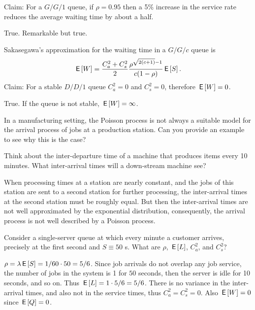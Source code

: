 \documentclass[stochastic-or.tex]{subfiles}
\begin{document}
\begin{truefalse}
Claim: For a $G/G/1$ queue, if $\rho=0.95$ then a 5\% increase in the service rate reduces the average waiting time by about a half.
    \begin{solution}
        True. Remarkable but true.
    \end{solution}
\end{truefalse}

\begin{truefalse}
Sakasegawa's approximation for the waiting time in a $G/G/c$ queue is
\begin{equation*}
 \,\mathsf{E}\left[W\right] = \frac{C_a^2+C_s^2}2 \frac{\rho^{\sqrt{2(c+1)}-1}}{c(1-\rho)} \,\mathsf{E}\left[S\right].
\end{equation*}
Claim: For a stable $D/D/1$ queue $C_a^2=0$ and $C_s^2=0$, therefore $\,\mathsf{E}\left[W\right]=0$.
\begin{solution}
True. If the queue is not stable, $\,\mathsf{E}\left[W\right] = \infty$.
\end{solution}
\end{truefalse}

\begin{exercise}
In a manufacturing setting, the Poisson process is not always a suitable model for the arrival process of jobs at a production station. Can you provide an example to see why this is the case?
\begin{hint}
Think about the inter-departure time of a machine that produces items every 10 minutes. What inter-arrival times will a down-stream machine see?

\end{hint}
\begin{solution}
  When processing times at a station are nearly constant, and the jobs of this station are sent to a second station for further processing, the inter-arrival times at the second station must be roughly equal.
  But then the inter-arrival times are not well approximated by the exponential distribution, consequently, the arrival process is not well described by a Poisson process.
\end{solution}
\end{exercise}


\begin{exercise}\label{ex:77}
 Consider  a single-server queue at which every minute a customer arrives, precisely at the first second and $S\equiv 50$ s.
 What are $\rho$, $\,\mathsf{E}\left[L\right]$, $C_a^2$, and $C_s^2$?
\begin{solution}
 $\rho = \lambda \,\mathsf{E}\left[S\right] = 1/60 \cdot 50 = 5/6$.
 Since job arrivals do not overlap any job service, the number of jobs in the system is 1 for $50$ seconds, then the server is idle for 10 seconds, and so on.
 Thus $\,\mathsf{E}\left[L\right] = 1\cdot5/6 = 5/6$.
 There is no variance in the inter-arrival times, and also not in the service times, thus $C_a^2 = C_s^2 = 0$.
 Also $\,\mathsf{E}\left[W\right]=0$ since $\,\mathsf{E}\left[Q\right]=0$.
\end{solution}
\end{exercise}
\end{document}
